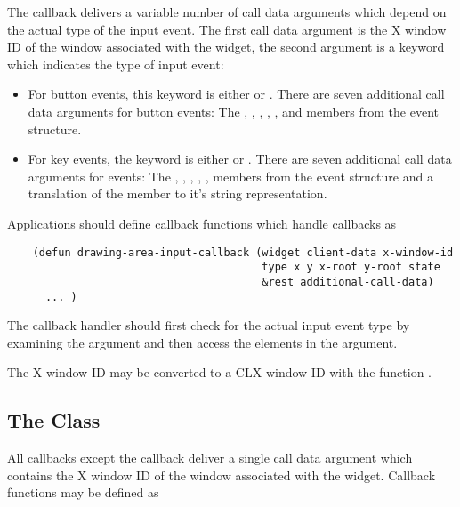 The  callback delivers a variable number of call data arguments which
depend on the actual type of the input event. The first call data argument
is the X window ID of the window associated with the  widget, the second argument is a keyword which indicates the type of input event:

\begin{itemize}
\item For button events, this keyword is either  or
.  There are seven additional call data arguments for button
events: The , , , , ,
 and  members from the  event
structure. 

\item For key events, the keyword is either  or .
There are seven additional call data arguments for events: The , , , , ,  members from
the  event structure and a translation of the  member
to it's string representation.
\end{itemize}

Applications should define callback functions which handle  callbacks
as

\begin{verbatim}
    (defun drawing-area-input-callback (widget client-data x-window-id
                                        type x y x-root y-root state
                                        &rest additional-call-data)
      ... )
\end{verbatim}

The callback handler should first check for the actual input event type by
examining the  argument and then access the elements in the
 argument.

The X window ID may be converted to a CLX window ID with the function
.

\subsection{The Class }

All callbacks except the  callback deliver a single call data
argument which contains the X window ID of the window associated with the
 widget.  Callback functions may be defined as

